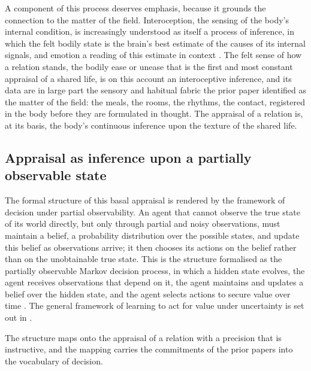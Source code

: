 A component of this process deserves emphasis, because it grounds the connection to the matter of the field. Interoception, the sensing of the body's internal condition, is increasingly understood as itself a process of inference, in which the felt bodily state is the brain's best estimate of the causes of its internal signals, and emotion a reading of this estimate in context \parencite{seth2013}. The felt sense of how a relation stands, the bodily ease or unease that is the first and most constant appraisal of a shared life, is on this account an interoceptive inference, and its data are in large part the sensory and habitual fabric the prior paper identified as the matter of the field: the meals, the rooms, the rhythms, the contact, registered in the body before they are formulated in thought. The appraisal of a relation is, at its basis, the body's continuous inference upon the texture of the shared life.

\subsection{Appraisal as inference upon a partially observable state}
\label{p11:sec:ap-pomdp}

The formal structure of this basal appraisal is rendered by the framework of decision under partial observability. An agent that cannot observe the true state of its world directly, but only through partial and noisy observations, must maintain a belief, a probability distribution over the possible states, and update this belief as observations arrive; it then chooses its actions on the belief rather than on the unobtainable true state. This is the structure formalised as the partially observable Markov decision process, in which a hidden state evolves, the agent receives observations that depend on it, the agent maintains and updates a belief over the hidden state, and the agent selects actions to secure value over time \parencite{kaelbling1998}. The general framework of learning to act for value under uncertainty is set out in \textcite{sutton_barto_rl}.

The structure maps onto the appraisal of a relation with a precision that is instructive, and the mapping carries the commitments of the prior papers into the vocabulary of decision.

